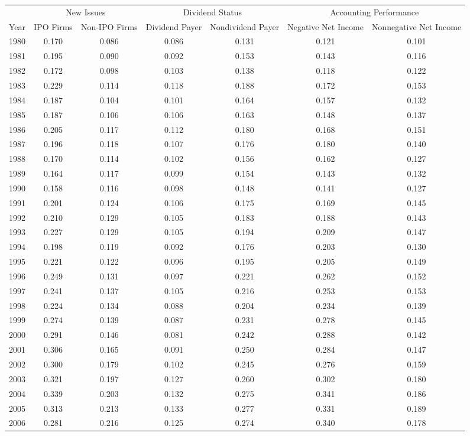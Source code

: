 \begin{tabular}{l c c c c c c}
\toprule
& \multicolumn{2}{c}{New Issues} & \multicolumn{2}{c}{Dividend Status} & \multicolumn{2}{c}{Accounting Performance} \\
\cmidrule(lr){2-3} \cmidrule(lr){4-5} \cmidrule(lr){6-7}
Year & \multicolumn{1}{p{2cm}}{\centering IPO Firms} & \multicolumn{1}{p{2cm}}{\centering Non-IPO Firms} & \multicolumn{1}{p{2cm}}{\centering Dividend Payer} & \multicolumn{1}{p{2cm}}{\centering Nondividend Payer} & \multicolumn{1}{p{2cm}}{\centering Negative Net Income} & \multicolumn{1}{p{2cm}}{\centering Nonnegative Net Income}\\
\midrule
1980&0.170&0.086&0.086&0.131&0.121&0.101\\
1981&0.195&0.090&0.092&0.153&0.143&0.116\\
1982&0.172&0.098&0.103&0.138&0.118&0.122\\
1983&0.229&0.114&0.118&0.188&0.172&0.153\\
1984&0.187&0.104&0.101&0.164&0.157&0.132\\
1985&0.187&0.106&0.106&0.163&0.148&0.137\\
1986&0.205&0.117&0.112&0.180&0.168&0.151\\
1987&0.196&0.118&0.107&0.176&0.180&0.140\\
1988&0.170&0.114&0.102&0.156&0.162&0.127\\
1989&0.164&0.117&0.099&0.154&0.143&0.132\\
1990&0.158&0.116&0.098&0.148&0.141&0.127\\
1991&0.201&0.124&0.106&0.175&0.169&0.145\\
1992&0.210&0.129&0.105&0.183&0.188&0.143\\
1993&0.227&0.129&0.105&0.194&0.209&0.147\\
1994&0.198&0.119&0.092&0.176&0.203&0.130\\
1995&0.221&0.122&0.096&0.195&0.205&0.149\\
1996&0.249&0.131&0.097&0.221&0.262&0.152\\
1997&0.241&0.137&0.105&0.216&0.253&0.153\\
1998&0.224&0.134&0.088&0.204&0.234&0.139\\
1999&0.274&0.139&0.087&0.231&0.278&0.145\\
2000&0.291&0.146&0.081&0.242&0.288&0.142\\
2001&0.306&0.165&0.091&0.250&0.284&0.147\\
2002&0.300&0.179&0.102&0.245&0.276&0.159\\
2003&0.321&0.197&0.127&0.260&0.302&0.180\\
2004&0.339&0.203&0.132&0.275&0.341&0.186\\
2005&0.313&0.213&0.133&0.277&0.331&0.189\\
2006&0.281&0.216&0.125&0.274&0.340&0.178\\
\bottomrule
\end{tabular}
